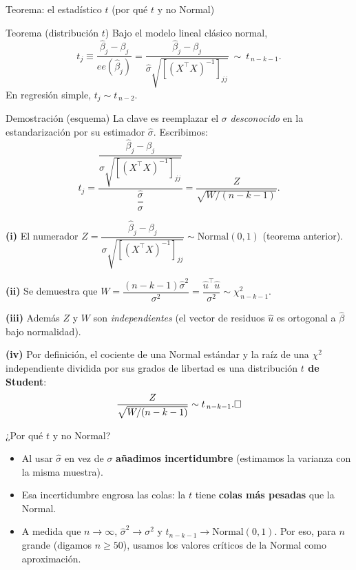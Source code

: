 \documentclass{beamer}
\begin{document}
\begin{frame}[allowframebreaks]{Teorema: el estadístico $t$ (por qué $t$ y no Normal)}

\begin{alertblock}{Teorema (distribución $t$)}
Bajo el modelo lineal clásico normal,
\[
t_j \equiv \frac{\hat{\beta}_j - \beta_j}{ee(\hat{\beta}_j)}
= \frac{\hat{\beta}_j - \beta_j}{\hat{\sigma}\sqrt{[(X^{\top}X)^{-1}]_{jj}}}
\ \sim\ t_{\,n-k-1}.
\]
En regresión simple, $t_j \sim t_{\,n-2}$.
\end{alertblock}

\begin{exampleblock}{Demostración (esquema)}
La clave es reemplazar el $\sigma$ \emph{desconocido} en la estandarización por su estimador $\hat{\sigma}$. Escribimos:
\[
t_j = \frac{\dfrac{\hat{\beta}_j - \beta_j}{\sigma\sqrt{[(X^{\top}X)^{-1}]_{jj}}}}
{\dfrac{\hat{\sigma}}{\sigma}}
= \frac{Z}{\sqrt{W/(n-k-1)}}.
\]

\textbf{(i)} El numerador $Z=\dfrac{\hat{\beta}_j - \beta_j}{\sigma\sqrt{[(X^{\top}X)^{-1}]_{jj}}} \sim \text{Normal}(0,1)$ (teorema anterior).

\medskip
\textbf{(ii)} Se demuestra que $W = \dfrac{(n-k-1)\hat{\sigma}^2}{\sigma^2}=\dfrac{\hat{u}^\top\hat{u}}{\sigma^2} \sim \chi^2_{\,n-k-1}$.

\medskip
\textbf{(iii)} Además $Z$ y $W$ son \emph{independientes} (el vector de residuos $\hat{u}$ es ortogonal a $\hat{\beta}$ bajo normalidad).

\medskip
\textbf{(iv)} Por definición, el cociente de una Normal estándar y la raíz de una $\chi^2$ independiente dividida por sus grados de libertad es una distribución \textbf{$t$ de Student}:
\[
\frac{Z}{\sqrt{W/(n-k-1)}} \sim t_{\,n-k-1}. \hfill \square
\]
\end{exampleblock}

\framebreak

\begin{block}{¿Por qué $t$ y no Normal?}
\begin{itemize}
    \item Al usar $\hat{\sigma}$ en vez de $\sigma$ \textbf{añadimos incertidumbre} (estimamos la varianza con la misma muestra).
    \item Esa incertidumbre engrosa las colas: la $t$ tiene \textbf{colas más pesadas} que la Normal.
    \item A medida que $n\to\infty$, $\hat{\sigma}^2\to\sigma^2$ y $t_{n-k-1}\to \text{Normal}(0,1)$. Por eso, para $n$ grande (digamos $n\geq 50$), usamos los valores críticos de la Normal como aproximación.
\end{itemize}
\end{block}


\end{frame}
\end{document}
